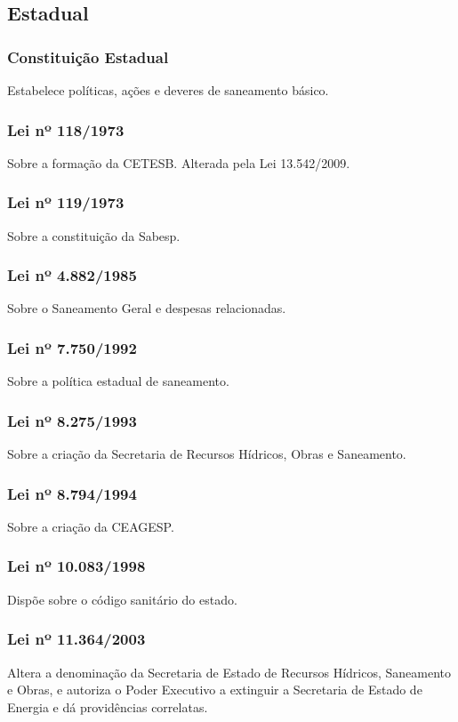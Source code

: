 \begin{subapend}
	\subsection{Estadual}
	\begin{subsubapend}
		\item \subsubsection{Constituição Estadual}
		Estabelece políticas, ações e deveres de saneamento básico.
		\subsubsection{Lei nº 118/1973}
		Sobre a formação da CETESB. Alterada pela Lei 13.542/2009.
		\subsubsection{Lei nº 119/1973}
		Sobre a constituição da Sabesp.
		\subsubsection{Lei nº 4.882/1985}
		Sobre o Saneamento Geral e despesas relacionadas.
		\subsubsection{Lei nº 7.750/1992}
		Sobre a política estadual de saneamento.
		\subsubsection{Lei nº 8.275/1993}
		Sobre a criação da Secretaria de Recursos Hídricos, Obras e Saneamento.
		\subsubsection{Lei nº 8.794/1994}
		Sobre a criação da CEAGESP.
		\subsubsection{Lei nº 10.083/1998}
		Dispõe sobre o código sanitário do estado.
		\subsubsection{Lei nº 11.364/2003}
		Altera a denominação da Secretaria de Estado de Recursos Hídricos, Saneamento e Obras, e autoriza o Poder Executivo a extinguir a Secretaria de Estado de Energia e dá providências correlatas.

\end{subsubapend}
\end{subapend}
